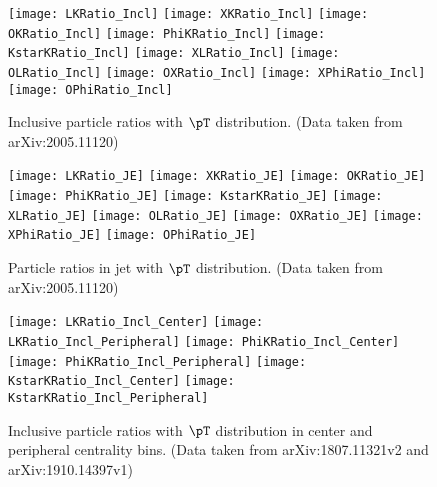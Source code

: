 \begin{figure}[ht]
        \begin{center}
                \texttt{[image: LKRatio\_Incl]}
                \texttt{[image: XKRatio\_Incl]}
                \texttt{[image: OKRatio\_Incl]}
                \texttt{[image: PhiKRatio\_Incl]}
                \texttt{[image: KstarKRatio\_Incl]}
                \texttt{[image: XLRatio\_Incl]}
                \texttt{[image: OLRatio\_Incl]}
                \texttt{[image: OXRatio\_Incl]}
                \texttt{[image: XPhiRatio\_Incl]}
                \texttt{[image: OPhiRatio\_Incl]}
        \end{center}
	\caption{Inclusive particle ratios with $\pT$ distribution. (Data taken from arXiv:2005.11120)}
        \label{fig:InclParRatio}
\end{figure}

\begin{figure}[ht]
        \begin{center}
                \texttt{[image: LKRatio\_JE]}
                \texttt{[image: XKRatio\_JE]}
                \texttt{[image: OKRatio\_JE]}
                \texttt{[image: PhiKRatio\_JE]}
                \texttt{[image: KstarKRatio\_JE]}
                \texttt{[image: XLRatio\_JE]}
                \texttt{[image: OLRatio\_JE]}
                \texttt{[image: OXRatio\_JE]}
                \texttt{[image: XPhiRatio\_JE]}
                \texttt{[image: OPhiRatio\_JE]}
        \end{center}
	\caption{Particle ratios in jet with $\pT$ distribution. (Data taken from arXiv:2005.11120)}
        \label{fig:JEParRatio}
\end{figure}

\begin{figure}[ht]
	\begin{center}
		\texttt{[image: LKRatio\_Incl\_Center]}
		\texttt{[image: LKRatio\_Incl\_Peripheral]}
		\texttt{[image: PhiKRatio\_Incl\_Center]}
		\texttt{[image: PhiKRatio\_Incl\_Peripheral]}
		\texttt{[image: KstarKRatio\_Incl\_Center]}
		\texttt{[image: KstarKRatio\_Incl\_Peripheral]}
	\end{center}
  \caption{Inclusive particle ratios  with $\pT$ distribution in center and peripheral centrality bins. (Data taken from arXiv:1807.11321v2 and arXiv:1910.14397v1)}
  \label{fig:InclParRatioCentPeri}
\end{figure}

